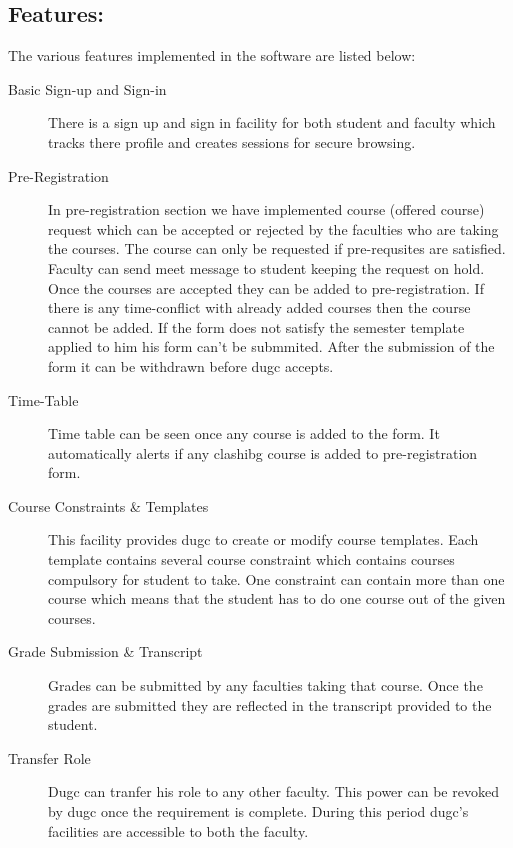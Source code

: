 \documentclass[letterpaper,12pt]{article}
\begin{document}
\subsection{Features:}
The various features implemented in the software are listed below:
\begin{description}
\item[Basic Sign-up and Sign-in]
There is a sign up and sign in facility for both student and faculty which
tracks there profile and creates sessions for secure browsing.
\item[Pre-Registration]
 In pre-registration section we have implemented course (offered course) request
 which can be accepted or rejected by the faculties who are taking the courses.
 The course can only be requested if pre-requsites are satisfied. Faculty can send
 meet message to student keeping the request on hold.
 Once the courses are accepted they can be added to pre-registration. If there is any 
 time-conflict with already added courses then the course cannot be added.
 If the form does not satisfy the semester template applied to him his form can't be submmited.
 After the submission of the form it can be withdrawn before dugc accepts.
 \item[Time-Table]
 Time table can be seen once any course is added to the form. It automatically alerts if any 
 clashibg course is added to pre-registration form.
 \item[Course Constraints \& Templates]
 This facility provides dugc to create or modify course templates. Each template contains 
 several course constraint which contains courses compulsory for student to take. One constraint
 can contain more than one course which means that the student has to do one course out of the given courses.
 \item[Grade Submission \& Transcript]
 Grades can be submitted by any faculties taking that
 course. Once the grades are submitted they are reflected in the transcript provided to the student.
 \item[Transfer Role]
Dugc can tranfer his role to any other faculty. This power can be revoked by dugc once the requirement
is complete. During this period dugc's facilities are accessible to both the faculty.
\end{description}
\end{document}
